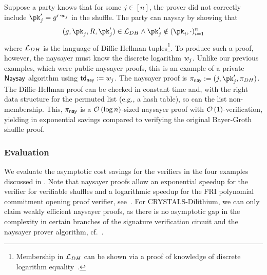 Suppose a party knows that for some $j\in[n]$, the prover did not correctly include $\pk_j' = g^{r\cdot \witness_j}$ in the shuffle. The party can naysay by showing that 
\[
    (g,\pk_j,R,\pk_j')\in\Lang_{DH}\land \pk_j' \notin (\pk_i,\cdot)_{i=1}^n
\]
where $\mathcal{L}_{DH}$ is the language of Diffie-Hellman tuples\footnote{Membership in $\mathcal{L}_{DH}$ can be shown via a proof of knowledge of discrete logarithm equality~\cite{C:ChaPed92}.}. To produce such a proof, however, the naysayer must know the discrete logarithm $w_j$. Unlike our previous examples, which were public naysayer proofs, this is an example of a private $\mathsf{Naysay}$ algorithm using $\mathsf{td}_{\mathsf{nay}} := w_j$. The naysayer proof is $\pi_\nay := (j, \pk_j', \pi_{DH})$. The Diffie-Hellman proof can be checked in constant time and, with the right data structure for the permuted list (e.g., a hash table), so can the list non-membership. This, $\pi_{\mathsf{nay}}$ is a $\mathcal{O}\left(\log{n}\right)$-sized naysayer proof with $\mathcal{O}\left(1\right)$-verification, yielding in exponential savings compared to verifying the original Bayer-Groth shuffle proof.

\subsubsection{Evaluation}
We evaluate the asymptotic cost savings for the verifiers in the four examples discussed in . Note that naysayer proofs allow an exponential speedup for the verifier for verifiable shuffles and a logarithmic speedup for the FRI polynomial commitment opening proof verifier, see~. For CRYSTALS-Dilithium, we can only claim weakly efficient naysayer proofs, as there is no asymptotic gap in the complexity in certain branches of the signature verification circuit and the naysayer prover algorithm, cf.~.



